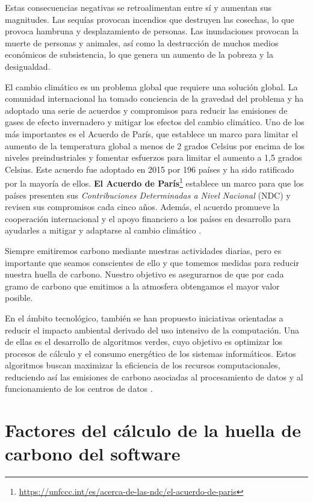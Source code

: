 \documentclass[12pt,a4paper]{report}
\begin{document}
Estas consecuencias negativas se retroalimentan entre sí y aumentan sus
magnitudes. Las sequías provocan incendios que destruyen las cosechas, lo que
provoca hambruna y desplazamiento de personas. Las inundaciones provocan la
muerte de personas y animales, así como la destrucción de muchos medios
económicos de subsistencia, lo que genera un aumento de la pobreza y la
desigualdad.

El cambio climático es un problema global que requiere una solución global. La
comunidad internacional ha tomado conciencia de la gravedad del problema y ha
adoptado una serie de acuerdos y compromisos para reducir las emisiones de
gases de efecto invernadero y mitigar los efectos del cambio climático. Uno de
los más importantes es el Acuerdo de París, que establece un marco para limitar
el aumento de la temperatura global a menos de 2 grados Celsius por encima de
los niveles preindustriales y fomentar esfuerzos para limitar el aumento a 1,5
grados Celsius. Este acuerdo fue adoptado en 2015 por 196 países y ha sido
ratificado por la mayoría de ellos. \textbf{El Acuerdo de París}\footnote{\href{https://unfccc.int/es/acerca-de-las-ndc/el-acuerdo-de-paris}{https://unfccc.int/es/acerca-de-las-ndc/el-acuerdo-de-paris}} establece un marco para
que los países presenten sus \textit{Contribuciones Determinadas a Nivel Nacional} (NDC)
y revisen sus compromisos cada cinco años. Además, el acuerdo promueve la
cooperación internacional y el apoyo financiero a los países en desarrollo para
ayudarles a mitigar y adaptarse al cambio climático \cite{ref4}. 

Siempre emitiremos carbono mediante nuestras actividades diarias, pero es
importante que seamos conscientes de ello y que tomemos medidas para reducir
nuestra huella de carbono. Nuestro objetivo es asegurarnos de que por cada
gramo de carbono que emitimos a la atmosfera obtengamos el mayor valor posible.

En el ámbito tecnológico, también se han propuesto iniciativas orientadas a reducir 
el impacto ambiental derivado del uso intensivo de la computación. Una de ellas es 
el desarrollo de algoritmos verdes, cuyo objetivo es optimizar los procesos de 
cálculo y el consumo energético de los sistemas informáticos. Estos algoritmos 
buscan maximizar la eficiencia de los recursos computacionales, reduciendo así las 
emisiones de carbono asociadas al procesamiento de datos y al funcionamiento de los 
centros de datos \cite{ref5}.

\section{Factores del cálculo de la huella de carbono del software}
\end{document}
